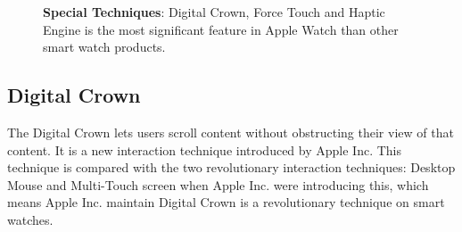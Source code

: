 \begin{figure}[H]
    \kaishu
    \centering
    \caption{\textbf{Special Techniques}: Digital Crown, Force Touch and Haptic Engine is the most significant feature in Apple Watch than other smart watch products.}
    \label{fig:special}
\end{figure}

\subsection{Digital Crown}

The Digital Crown lets users scroll content without obstructing their view of that content. It is a new interaction technique introduced by Apple Inc.
This technique is compared with the two revolutionary interaction techniques: Desktop Mouse and Multi-Touch screen when Apple Inc. were introducing this, which means Apple Inc. maintain Digital Crown is a revolutionary technique on smart watches.

